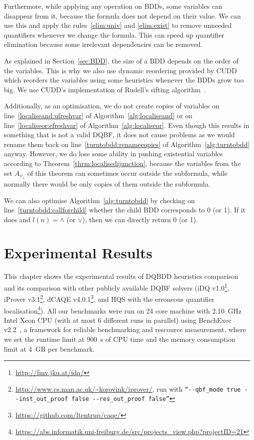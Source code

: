 \documentclass[
  digital, %
  color,
  twoside, %
  table,   %
  nolof,     %
  nolot,     %
]{fithesis3}
\theoremstyle{definition}
\theoremstyle{remark}
\newcommand{\qtlabel}[1]{l({#1})}
\begin{document}
Furthermore, while applying any operation on BDDs, some variables can disappear from it, because the formula does not depend on their value. We can use this and apply the rules~\eqref{elim:univ} and \eqref{elim:exist} to remove unneeded quantifiers whenever we change the formula. This can speed up quantifier elimination because some irrelevant dependencies can be removed.

As explained in Section~\ref{sec:BDD}, the size of a BDD depends on the order of the variables. This is why we also use dynamic reordering provided by CUDD which reorders the variables using some heuristics whenever the BDDs grow too big. We use CUDD's implementation of Rudell's sifting algorithm~\cite{BDDsifting}.

Additionally, as an optimisation, we do not create copies of variables on line~\ref{localiseand:ufreshvar} of Algorithm~\ref{alg:localiseand} or on line~\ref{localiseor:efreshvar} of Algorithm~\ref{alg:localiseor}. Even though this results in something that is not a valid DQBF, it does not cause problems as we would rename them back on line~\ref{turntobdd:renamecopies} of Algorithm~\ref{alg:turntobdd} anyway. However, we do lose some ability in pushing existential variables according to Theorem~\ref{thrm:localisedijunction}, because the variables from the set $A_{\psi_1}$ of this theorem can sometimes occur outside the subformula, while normally there would be only copies of them outside the subformula.

We can also optimise Algorithm~\ref{alg:turntobdd} by checking on line~\ref{turntobdd:callforchild} whether the child BDD corresponds to 0 (or 1). If it does and $\qtlabel{n} = {\land}$ (or ${\lor}$), then we can directly return 0 (or 1).

\chapter{Experimental Results}
\label{chap:experiments}
This chapter shows the experimental results of DQBDD heuristics comparison and its comparison with other publicly available DQBF solvers 
(iDQ v1.0\footnote{\url{http://fmv.jku.at/idq/}},
iProver v3.1\footnote{\url{http://www.cs.man.ac.uk/~korovink/iprover/}, run with \texttt{``-{}-qbf\_mode true -{}-inst\_out\_proof false -{}-res\_out\_proof false''}},
dCAQE v4.0.1\footnote{\url{https://github.com/ltentrup/caqe/}},
and HQS with the erroneous quantifier localisation\footnote{\url{https://abs.informatik.uni-freiburg.de/src/projects_view.php?projectID=21}}). All our benchmarks were run on 24 core machine with \SI{2.10}{GHz} Intel Xeon CPU (with at most 6 different runs in parallel) using BenchExec v2.2~\cite{benchexec}, a framework for reliable benchmarking and rescource measurement, where we set the runtime limit at \SI{900}{s} of CPU time and the memory consumption limit at \SI{4}{GB} per benchmark.
\end{document}
